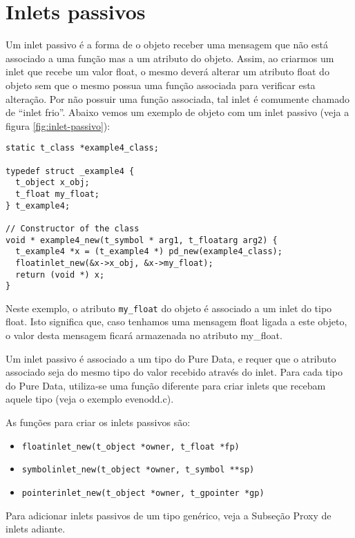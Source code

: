 \section{Inlets passivos}

Um inlet passivo é a forma de o objeto receber uma mensagem que não está
associado a uma função mas a um atributo do objeto.
Assim, ao criarmos um inlet que recebe um valor float, o mesmo deverá alterar um
atributo float do objeto sem que o mesmo possua uma função associada para
verificar esta alteração.
Por não possuir uma função associada, tal inlet é comumente chamado de ``inlet
frio''.
Abaixo vemos um exemplo de objeto com um inlet passivo (veja a figura
\ref{fig:inlet-passivo}):

\begin{lstlisting}[caption=Exemplo de inlet passivo]
static t_class *example4_class;

typedef struct _example4 {
  t_object x_obj;
  t_float my_float;
} t_example4;

// Constructor of the class
void * example4_new(t_symbol * arg1, t_floatarg arg2) {
  t_example4 *x = (t_example4 *) pd_new(example4_class);
  floatinlet_new(&x->x_obj, &x->my_float);
  return (void *) x;
}
\end{lstlisting}

Neste exemplo, o atributo \texttt{my\_float} do objeto é associado a um inlet do
tipo float.
Isto  significa que, caso tenhamos uma mensagem float ligada a este objeto, o valor
desta mensagem ficará armazenada no atributo my\_float.

Um inlet passivo é associado a um tipo do Pure Data, e requer que o atributo
associado seja do mesmo tipo do valor recebido através do inlet.
Para cada tipo do Pure Data, utiliza-se uma função diferente para criar inlets
que recebam aquele tipo (veja o exemplo evenodd.c).

As funções para criar os inlets passivos são:

\begin{itemize}
\item \texttt{floatinlet\_new(t\_object *owner, t\_float *fp)}
\item \texttt{symbolinlet\_new(t\_object *owner, t\_symbol **sp)}
\item \texttt{pointerinlet\_new(t\_object *owner, t\_gpointer *gp)}
\end{itemize}

Para adicionar inlets passivos de um tipo genérico, veja a Subseção Proxy de inlets
adiante.

